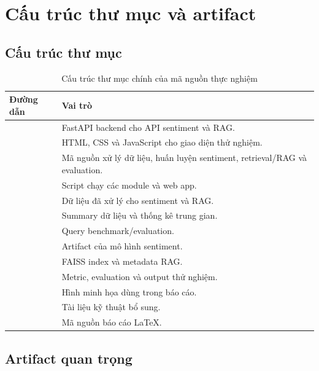 \chapter{Cấu trúc thư mục và artifact}

\section{Cấu trúc thư mục}
\begingroup
\small
\begin{longtable}{L{0.32\textwidth}L{0.58\textwidth}}
\caption{Cấu trúc thư mục chính của mã nguồn thực nghiệm}\label{tab:appendix-project-structure}\\
\toprule
Đường dẫn & Vai trò \\
\midrule
{} & FastAPI backend cho API sentiment và RAG. \\
 & HTML, CSS và JavaScript cho giao diện thử nghiệm. \\
 & Mã nguồn xử lý dữ liệu, huấn luyện sentiment, retrieval/RAG và evaluation. \\
 & Script chạy các module và web app. \\
 & Dữ liệu đã xử lý cho sentiment và RAG. \\
 & Summary dữ liệu và thống kê trung gian. \\
 & Query benchmark/evaluation. \\
 & Artifact của mô hình sentiment. \\
 & FAISS index và metadata RAG. \\
 & Metric, evaluation và output thử nghiệm. \\
 & Hình minh họa dùng trong báo cáo. \\
 & Tài liệu kỹ thuật bổ sung. \\
 & Mã nguồn báo cáo LaTeX. \\
\bottomrule
\end{longtable}
\endgroup

\section{Artifact quan trọng}


